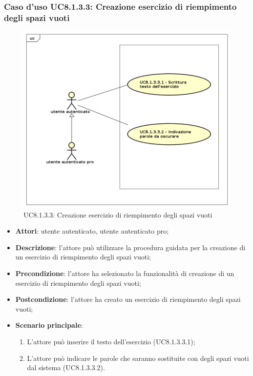 \subsubsection{Caso d'uso UC8.1.3.3: Creazione esercizio di riempimento degli spazi vuoti}
	\label{UC8.1.3.3}
	\begin{figure}[h]
		\centering
			\includegraphics[scale=0.45,keepaspectratio]{UML/UC8_1_3_3.png}
		\caption{UC8.1.3.3: Creazione esercizio di riempimento degli spazi vuoti}
	\end{figure}
	\FloatBarrier
	\begin{itemize}
		\item
			\textbf{Attori}: utente autenticato, utente autenticato pro;
		\item		
			\textbf{Descrizione}: l'attore può utilizzare la procedura guidata per la creazione di un esercizio di riempimento degli spazi vuoti;
		\item
			\textbf{Precondizione}: l'attore ha selezionato la funzionalità di creazione di un esercizio di riempimento degli spazi vuoti;
		\item
			\textbf{Postcondizione}: l'attore ha creato un esercizio di riempimento degli spazi vuoti;
		\item
			\textbf{Scenario principale}:
	       		\begin{enumerate}
	       			\item
	       			L'attore può inserire il testo dell'esercizio (UC8.1.3.3.1);
	       			\item
	       			L'attore può indicare le parole che saranno sostituite con degli spazi vuoti dal sistema (UC8.1.3.3.2).
	 			\end{enumerate}
	\end{itemize}
	
